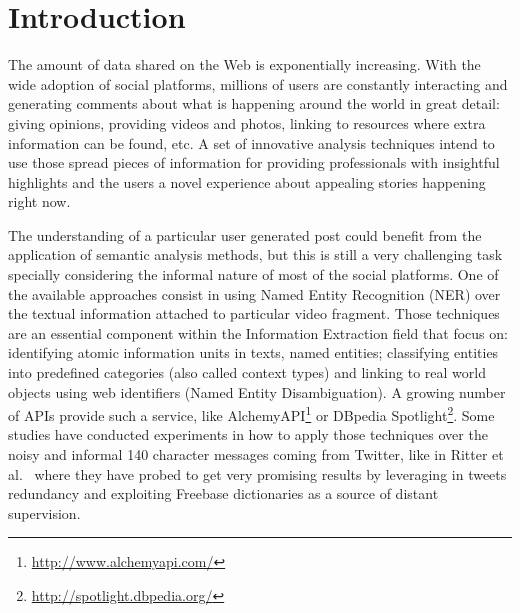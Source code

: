 \documentclass{sig-alternate}
\begin{document}



\section{Introduction}
\label{sec:introduction}
The amount of data shared on the Web is exponentially increasing. With the wide adoption of social platforms, millions of users are constantly interacting and generating comments about what is happening around the world in great detail: giving opinions, providing videos and photos, linking to resources where extra information can be found, etc. A set of innovative analysis techniques intend to use those spread pieces of information for providing professionals with insightful highlights and the users a novel experience about appealing stories happening right now.

The understanding of a particular user generated post could benefit from the application of semantic analysis methods, but this is still a very challenging task specially considering the informal nature of most of the social platforms. One of the available approaches consist in using Named Entity Recognition (NER) over the textual information attached to particular video fragment. Those techniques are an essential component within the Information Extraction field that focus on: identifying atomic information units in texts, named entities; classifying entities into predefined categories (also called context types) and linking to real world objects using web identifiers (Named Entity Disambiguation). A growing number of APIs provide such a service, like AlchemyAPI\footnote{\fontsize{8pt}{1em}\selectfont \url{http://www.alchemyapi.com/}} or DBpedia Spotlight\footnote{\fontsize{8pt}{1em}\selectfont \url{http://spotlight.dbpedia.org/}}. Some studies have conducted experiments in how to apply those techniques over the noisy and informal 140 character messages coming from Twitter, like in Ritter et al.~\cite{Ritter2011} where they have probed to get very promising results by leveraging in tweets redundancy and exploiting Freebase dictionaries as a source of distant supervision. 
\end{document}
